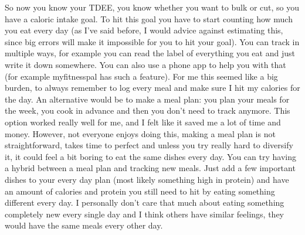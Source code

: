 \documentclass[openany, 12pt]{book}
\begin{document}
        So now you know your TDEE, you know whether you want to bulk or cut, so you have a caloric intake goal. To hit this goal you have to start counting how much you eat
        every day (as I've said before, I would advice against estimating this, since big errors will make it impossible for you to hit your goal). You can track in multiple
        ways, for example you can read the label of everything you eat and just write it down somewhere. You can also use a phone app to help you with that (for example myfitnesspal
        has such a feature). For me this seemed like a big burden, to always remember to log
        every meal and make sure I hit my calories for the day. An alternative would be to make a meal plan: you plan your meals for the week, you cook in advance and then you
        don't need to track anymore. This option worked really well for me, and I felt like it saved me a lot of time and money. However, not everyone enjoys doing this, making a meal
        plan is not straightforward, takes time to perfect and unless you try really hard to diversify it, it could feel a bit boring to eat the same dishes every day. You can
        try having a hybrid between a meal plan and tracking new meals. Just add a few important dishes to your every day plan (most likely something high in protein) and
        have an amount of calories and protein you still need to hit by eating something different every day. I personally don't care that much about eating something completely
        new every single day and I think others have similar feelings, they would have the same meals every other day.
\end{document}
